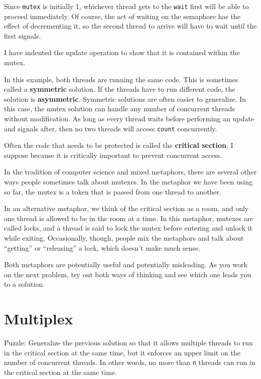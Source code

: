 \documentclass{book}
\begin{document}
Since {\tt mutex} is initially 1, whichever thread gets to
the {\tt wait} first will be able to proceed immediately.
Of course, the act of waiting on the semaphore has the effect
of decrementing it, so the second thread to
arrive will have to wait until the first signals.

I have indented the update operation to show that it is contained
within the mutex.

In this example, both threads are running the same code.  This is
sometimes called a {\bf symmetric} solution.  If the threads have to
run different code, the solution is {\bf asymmetric}.  Symmetric
solutions are often easier to generalize.  In this case, the mutex
solution can handle any number of concurrent threads without
modification.  As long as every thread waits before
performing an update and signals after, then no two threads
will access {\tt count} concurrently.

Often the code that needs to be protected is called the
    {\bf critical section}, I suppose because it is critically
important to prevent concurrent access.

In the tradition of computer science and mixed metaphors, there
are several other ways people sometimes talk about mutexes.  In
the metaphor we have been using so far, the mutex is a token
that is passed from one thread to another.

In an alternative
metaphor, we think of the critical section as a room, and
only one thread is allowed to be in the room at a time.
In this metaphor, mutexes are called locks, and a thread
is said to lock the mutex before entering and unlock it while
exiting.  Occasionally, though, people mix the metaphors and
talk about ``getting'' or ``releasing'' a lock, which doesn't
make much sense.

Both metaphors are potentially useful and potentially misleading.
As you work on the next problem, try out both ways of thinking
and see which one leads you to a solution.


\section{Multiplex}

Puzzle: Generalize the previous solution so that it allows multiple
threads to run in the critical section at the same time, but it
enforces an upper limit on the number of concurrent threads.  In other
words, no more than {\tt n} threads can run in the critical section at
the same time.
\end{document}

